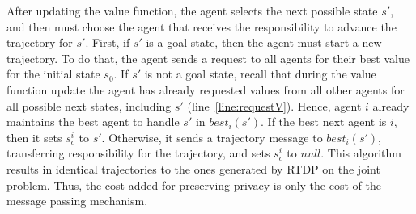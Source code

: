 \documentclass[letterpaper]{article} %
\theoremstyle{remark}
\begin{document}
After updating the value function, the agent selects the next possible state $s'$, and then must choose the agent that receives the responsibility to advance the trajectory for $s'$. First, if $s'$ is a goal state, then the agent must start a new trajectory. To do that, the agent sends a request to all agents for their best value for the initial state $s_0$. If $s'$ is not a goal state, recall that during the value function update the agent has already requested values from all other agents for all possible next states, including $s'$ (line~\ref{line:requestV}). Hence, agent $i$ already maintains the best agent to handle $s'$ in $best_i(s')$. If the best next agent is $i$, then it sets $s^i_c$ to $s'$. Otherwise, it sends a trajectory message to $best_i(s')$, transferring responsibility for the trajectory, and sets $s^i_c$ to $null$. This algorithm results in identical trajectories to the ones generated by RTDP on the joint problem. Thus, the cost added for preserving privacy is only the cost of the message passing mechanism.
\end{document}
